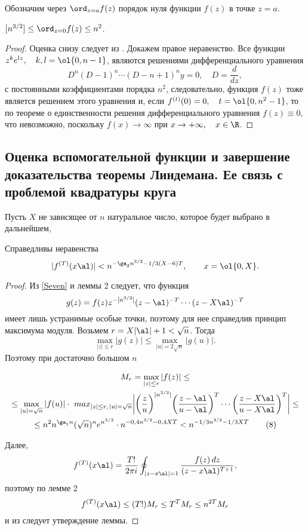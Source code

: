 \documentclass{article}
\begin{document}
Обозначим через $\ord_{z=a}f(z)$  порядок нуля функции $f(z)$  в точке
$z=a$.

\begin{lemma}
$[n^{3/2}] \le \ord_{z=0}f(z) \le n^2$.
\end{lemma}
\begin{proof}
Оценка снизу следует из . Докажем правое
неравенство.  Все функции $z^ke^{lz}, \quad k,l= \ol{0,n-1}$, являются решениями
дифференциального уравнения
$$
D^n(D-1)^n \cdots (D-n+1)^ny=0, \quad D=\frac d{dz},
$$
с постоянными коэффициентами порядка $n^2$, следовательно, функция  $f(z)$
тоже является решением этого уравнения и, если $f^{(t)}(0)=0, \quad
t=\ol{0,n^2-1}$, то по теореме о единственности решения дифференциального
уравнения  $f(z) \equiv 0$, что невозможно, поскольку $f(x) \to \infty$ при
$x\to  +\infty, \quad x\in\R$.
\end{proof}

\subsection{Оценка вспомогательной функции и завершение доказательства
теоремы Линдемана. Ее связь с проблемой квадратуры круга}

Пусть $X$ \т не зависящее от $n$
натуральное число, которое будет выбрано в дальнейшем,

\begin{lemma}
Справедливы неравенства
$$
|f^{(T)}(x \al)| < n^{-\ga_2n^{3/2}-1/3(X-6)T}, \qquad x=\ol{0,X}.
$$
\end{lemma}
\begin{proof}
Из \eqref{Seven} и леммы 2 следует, что функция
$$
g(z)=f(z)z^{-[n^{3/2}]}(z-\al)^{-T} \cdots (z-X\al)^{-T}
$$
имеет лишь устранимые особые точки, поэтому для нее справедлив принцип
максимума модуля. Возьмем $r=X|\al |+1<\sqrt n$. Тогда
$$
\max_{|z| \le r}|g(z)| \le \max_{|u|=2\sqrt n}|g(u)|.
$$
Поэтому   при достаточно большом $n$

\begin{gather}
M_r=\max_{|z| \le r}|f(z)| \le  \\
\le\max_{|u|=\sqrt n}|f(u)| \cdot \
max_{|z| \le r,\,  |u|=\sqrt n}
\biggl|\biggl(\frac zu \biggr)^{[n^{3/2}]}
\biggl(\frac{z-\al}{u-\al}\biggr)^T   \cdots
\biggl(\frac{z-X\al}{u-X\al}\biggr)^T \biggr| \le \\
\le n^2n^{\ga_1n}(\sqrt n)^n e^{n^{3/2}}\cdot
 n^{-0,4n^{3/2}-0,4XT}<n^{-1/3n^{3/2}-1/3XT}
\tag 8
\end{gather}

Далее,
$$
f^{(T)}(x\al)= \frac{T!}{2\pi i}\oint_{|z-x\al|=1}
\frac {f(z)\,dz}{(z-x\al)^{T+1}},
$$
поэтому по лемме 2
$$
f^{(T)}(x\al) \le (T!)M_r \le T^TM_r \le n^{2T}M_r
$$
и из  следует утверждение леммы.
\end{proof}
\end{document}
